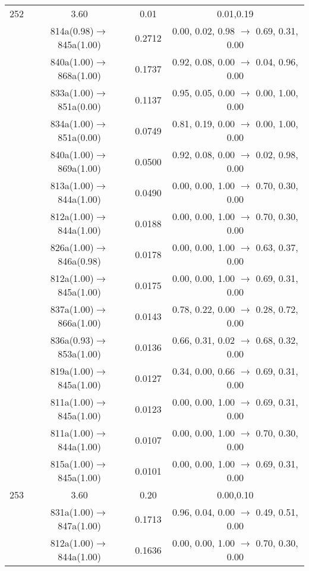 \documentclass[10pt,a4paper]{article}
\begin{document}
\begin{longtable}{c|c|c|c}
 \hline252 &	 3.60 &	 0.01 &	 0.01,0.19 \\ 
  	& 814a(0.98)$\rightarrow$845a(1.00) &	 0.2712 &	 0.00, 0.02, 0.98 $\rightarrow$ 0.69, 0.31, 0.00 \\ 
 	& 840a(1.00)$\rightarrow$868a(1.00) &	 0.1737 &	 0.92, 0.08, 0.00 $\rightarrow$ 0.04, 0.96, 0.00 \\ 
 	& 833a(1.00)$\rightarrow$851a(0.00) &	 0.1137 &	 0.95, 0.05, 0.00 $\rightarrow$ 0.00, 1.00, 0.00 \\ 
 	& 834a(1.00)$\rightarrow$851a(0.00) &	 0.0749 &	 0.81, 0.19, 0.00 $\rightarrow$ 0.00, 1.00, 0.00 \\ 
 	& 840a(1.00)$\rightarrow$869a(1.00) &	 0.0500 &	 0.92, 0.08, 0.00 $\rightarrow$ 0.02, 0.98, 0.00 \\ 
 	& 813a(1.00)$\rightarrow$844a(1.00) &	 0.0490 &	 0.00, 0.00, 1.00 $\rightarrow$ 0.70, 0.30, 0.00 \\ 
 	& 812a(1.00)$\rightarrow$844a(1.00) &	 0.0188 &	 0.00, 0.00, 1.00 $\rightarrow$ 0.70, 0.30, 0.00 \\ 
 	& 826a(1.00)$\rightarrow$846a(0.98) &	 0.0178 &	 0.00, 0.00, 1.00 $\rightarrow$ 0.63, 0.37, 0.00 \\ 
 	& 812a(1.00)$\rightarrow$845a(1.00) &	 0.0175 &	 0.00, 0.00, 1.00 $\rightarrow$ 0.69, 0.31, 0.00 \\ 
 	& 837a(1.00)$\rightarrow$866a(1.00) &	 0.0143 &	 0.78, 0.22, 0.00 $\rightarrow$ 0.28, 0.72, 0.00 \\ 
 	& 836a(0.93)$\rightarrow$853a(1.00) &	 0.0136 &	 0.66, 0.31, 0.02 $\rightarrow$ 0.68, 0.32, 0.00 \\ 
 	& 819a(1.00)$\rightarrow$845a(1.00) &	 0.0127 &	 0.34, 0.00, 0.66 $\rightarrow$ 0.69, 0.31, 0.00 \\ 
 	& 811a(1.00)$\rightarrow$845a(1.00) &	 0.0123 &	 0.00, 0.00, 1.00 $\rightarrow$ 0.69, 0.31, 0.00 \\ 
 	& 811a(1.00)$\rightarrow$844a(1.00) &	 0.0107 &	 0.00, 0.00, 1.00 $\rightarrow$ 0.70, 0.30, 0.00 \\ 
 	& 815a(1.00)$\rightarrow$845a(1.00) &	 0.0101 &	 0.00, 0.00, 1.00 $\rightarrow$ 0.69, 0.31, 0.00 \\ 
 \hline253 &	 3.60 &	 0.20 &	 0.00,0.10 \\ 
  	& 831a(1.00)$\rightarrow$847a(1.00) &	 0.1713 &	 0.96, 0.04, 0.00 $\rightarrow$ 0.49, 0.51, 0.00 \\ 
 	& 812a(1.00)$\rightarrow$844a(1.00) &	 0.1636 &	 0.00, 0.00, 1.00 $\rightarrow$ 0.70, 0.30, 0.00 \\ 

\end{longtable}
\end{document}
